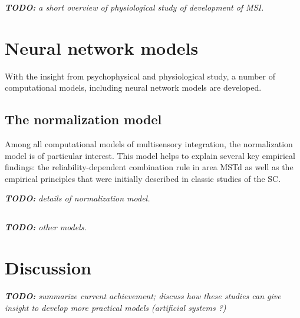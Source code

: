 \documentclass{article}[11pt]
\newcommand{\TODO}[1]{\emph{\small{{\bf TODO: } #1}}}
\begin{document}
\TODO{a short overview of physiological study of development of MSI.}

\section{Neural network models}
With the insight from psychophysical and physiological study, a number of computational models, including neural network models are developed. 

\subsection{The normalization model}
Among all computational models of multisensory integration, the normalization model\cite{ohshiro_normalization_2011} is of particular interest. This model helps to explain several key empirical findings: the reliability-dependent combination rule in area MSTd as well as
the empirical principles that were initially described in classic studies of the SC.

\TODO{details of normalization model.}

\subsection{}
\TODO{other models.}

\section{Discussion}
\TODO{summarize current achievement; discuss how these studies can give insight to develop more practical models (artificial systems ?)}



\end{document}
